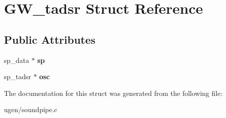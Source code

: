\hypertarget{structGW__tadsr}{}\section{G\+W\+\_\+tadsr Struct Reference}
\label{structGW__tadsr}
\subsection*{Public Attributes}
\begin{DoxyCompactItemize}
\item 
\hypertarget{structGW__tadsr_ad9f1e0e9c00809e8f3b59f9e1719dfe8}{}\label{structGW__tadsr_ad9f1e0e9c00809e8f3b59f9e1719dfe8} 
sp\+\_\+data $\ast$ {\bfseries sp}
\item 
\hypertarget{structGW__tadsr_ab6699cbc058fd9700ab63a438ab4849f}{}\label{structGW__tadsr_ab6699cbc058fd9700ab63a438ab4849f} 
sp\+\_\+tadsr $\ast$ {\bfseries osc}
\end{DoxyCompactItemize}


The documentation for this struct was generated from the following file\+:\begin{DoxyCompactItemize}
\item 
ugen/soundpipe.\+c\end{DoxyCompactItemize}
